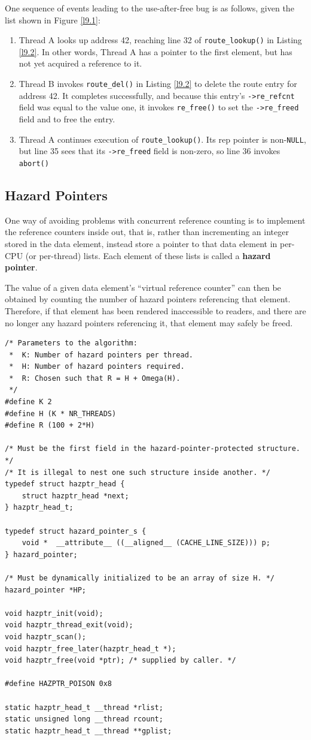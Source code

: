 \documentclass[11pt]{article}
\begin{document}
One sequence of events leading to the use-after-free bug is as follows, given the list shown in Figure \ref{l9.1}:
\begin{enumerate}
\item Thread A looks up address 42, reaching line 32 of \texttt{route\_lookup()} in Listing \ref{l9.2}. In other
words, Thread A has a pointer to the first element, but has not yet acquired a reference to it.
\item Thread B invokes \texttt{route\_del()} in Listing \ref{l9.2} to delete the route entry for address 42. It
completes successfully, and because this entry’s \texttt{->re\_refcnt} field was equal to the value one, it
invokes \texttt{re\_free()} to set the \texttt{->re\_freed} field and to free the entry.
\item Thread A continues execution of \texttt{route\_lookup()}. Its rep pointer is non-\texttt{NULL}, but line 35 sees that
its \texttt{->re\_freed} field is non-zero, so line 36 invokes \texttt{abort()}
\end{enumerate}
\subsection{Hazard Pointers}
\label{sec:org0e13213}
One way of avoiding problems with concurrent reference counting is to implement the reference counters
inside out, that is, rather than incrementing an integer stored in the data element, instead store a
pointer to that data element in per-CPU (or per-thread) lists. Each element of these lists is called a
\textbf{hazard pointer}.

The value of a given data element’s “virtual reference counter” can then be obtained by counting the
number of hazard pointers referencing that element. Therefore, if that element has been rendered
inaccessible to readers, and there are no longer any hazard pointers referencing it, that element may
safely be freed.

\begin{verbatim}
/* Parameters to the algorithm:
 *  K: Number of hazard pointers per thread.
 *  H: Number of hazard pointers required.
 *  R: Chosen such that R = H + Omega(H).
 */
#define K 2
#define H (K * NR_THREADS)
#define R (100 + 2*H)

/* Must be the first field in the hazard-pointer-protected structure. */
/* It is illegal to nest one such structure inside another. */
typedef struct hazptr_head {
	struct hazptr_head *next;
} hazptr_head_t;

typedef struct hazard_pointer_s {
	void *  __attribute__ ((__aligned__ (CACHE_LINE_SIZE))) p;
} hazard_pointer;

/* Must be dynamically initialized to be an array of size H. */
hazard_pointer *HP;

void hazptr_init(void);
void hazptr_thread_exit(void);
void hazptr_scan();
void hazptr_free_later(hazptr_head_t *);
void hazptr_free(void *ptr); /* supplied by caller. */

#define HAZPTR_POISON 0x8

static hazptr_head_t __thread *rlist;
static unsigned long __thread rcount;
static hazptr_head_t __thread **gplist;
\end{verbatim}
\end{document}
